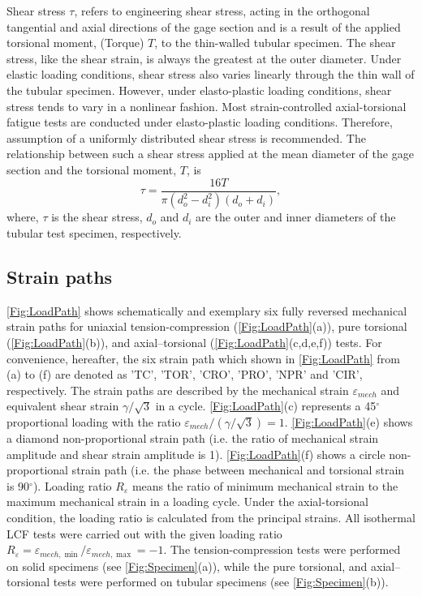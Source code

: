 Shear stress $\tau$, refers to engineering shear stress, acting in the orthogonal tangential and axial directions of the gage section and is a result of the applied torsional moment, (Torque) $T$, to the thin-walled tubular specimen. The shear stress, like the shear strain, is always the greatest at the outer diameter. Under elastic loading conditions, shear stress also varies linearly through the thin wall of the tubular specimen. However, under elasto-plastic loading conditions, shear stress tends to vary in a nonlinear fashion. Most strain-controlled axial-torsional fatigue tests are conducted under elasto-plastic loading conditions. Therefore, assumption of a uniformly distributed shear stress is recommended. The relationship between such a shear stress applied at the mean diameter of the gage section and the torsional moment, $T$, is
\begin{equation}
\tau=\frac{16T}{\pi(d_o^2-d_i^2)(d_o+d_i)},
\label{Equ:shear_stress}
\end{equation}
where, $\tau$ is the shear stress, $d_o$ and $d_i$ are the outer and inner diameters of the tubular test specimen, respectively.

\subsection{Strain paths}
\noindent
\ref{Fig:LoadPath} shows schematically and exemplary six fully reversed mechanical strain paths for uniaxial tension-compression (\ref{Fig:LoadPath}(a)), pure torsional (\ref{Fig:LoadPath}(b)), and axial–torsional (\ref{Fig:LoadPath}(c,d,e,f)) tests.
For convenience, hereafter, the six strain path which shown in \ref{Fig:LoadPath} from (a) to (f) are denoted as 'TC', 'TOR', 'CRO', 'PRO', 'NPR' and 'CIR', respectively.
The strain paths are described by the mechanical strain $\varepsilon_{mech}$ and equivalent shear strain $\gamma/\sqrt{3}$ in a cycle.
\ref{Fig:LoadPath}(c) represents a 45$^\circ$ proportional loading with the ratio $\varepsilon_{mech}/(\gamma/\sqrt{3})=1$. \ref{Fig:LoadPath}(e) shows a diamond non-proportional strain path (i.e. the ratio of mechanical strain amplitude and shear strain amplitude is 1). \ref{Fig:LoadPath}(f) shows a circle non-proportional strain path (i.e. the phase between mechanical and torsional strain is 90$^\circ$).
Loading ratio $R_\varepsilon$ means the ratio of minimum mechanical strain to the maximum mechanical strain in a loading cycle. Under the axial-torsional condition, the loading ratio is calculated from the principal strains.
All isothermal LCF tests were carried out with the given loading ratio $R_{\varepsilon}=\varepsilon_{mech,\min}/\varepsilon_{mech,\max}=-1$.
The tension-compression tests were performed on solid specimens (see \ref{Fig:Specimen}(a)), while the pure torsional, and axial–torsional tests were performed on tubular specimens (see \ref{Fig:Specimen}(b)).

